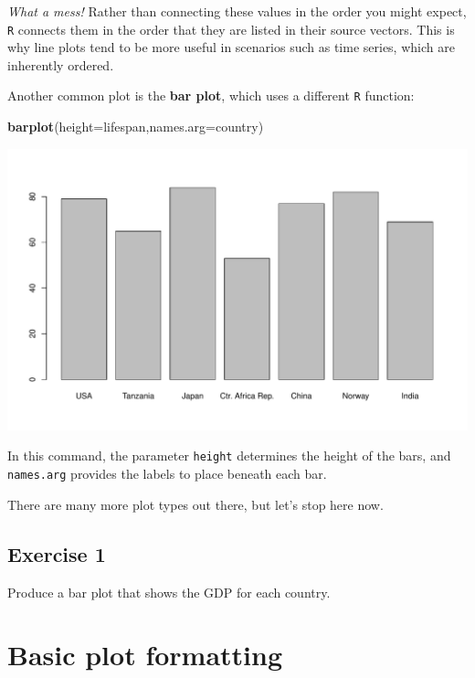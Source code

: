 \documentclass[
]{book}
\newenvironment{Shaded}{\begin{snugshade}}{\end{snugshade}}
\newcommand{\DataTypeTok}[1]{\textcolor[rgb]{0.13,0.29,0.53}{#1}}
\newcommand{\KeywordTok}[1]{\textcolor[rgb]{0.13,0.29,0.53}{\textbf{#1}}}
\newcommand{\NormalTok}[1]{#1}
\begin{document}
\emph{What a mess!} Rather than connecting these values in the order you might expect, \texttt{R} connects them in the order that they are listed in their source vectors. This is why line plots tend to be more useful in scenarios such as time series, which are inherently ordered.

Another common plot is the \textbf{bar plot}, which uses a different \texttt{R} function:

\begin{Shaded}
\begin{Highlighting}[]
\KeywordTok{barplot}\NormalTok{(}\DataTypeTok{height=}\NormalTok{lifespan,}\DataTypeTok{names.arg=}\NormalTok{country)}
\end{Highlighting}
\end{Shaded}

\includegraphics{figures/unnamed-chunk-101-1.pdf}

In this command, the parameter \texttt{height} determines the height of the bars, and \texttt{names.arg} provides the labels to place beneath each bar.

There are many more plot types out there, but let's stop here now.

\hypertarget{exercise-1-3}{%
\subsection*{Exercise 1}\label{exercise-1-3}}

Produce a bar plot that shows the GDP for each country.

\hypertarget{basic-plot-formatting}{%
\section*{Basic plot formatting}\label{basic-plot-formatting}}
\end{document}
